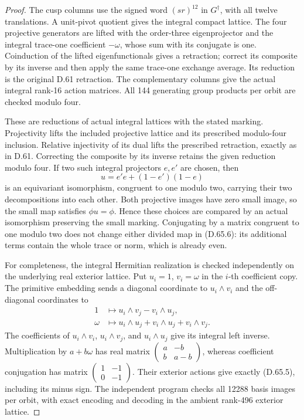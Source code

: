 \begin{proof}
The cusp columns use the signed word \((sr)^{12}\) in
\(G^\dagger\), with all twelve translations. A unit-pivot quotient
gives the integral compact lattice. The four projective generators
are lifted with the order-three eigenprojector and the integral
trace-one coefficient \(-\omega\), whose sum with its conjugate is
one. Coinduction of the lifted eigenfunctionals gives a retraction;
correct its composite by its inverse and then apply the same
trace-one exchange average. Its reduction is the original D.61
retraction. The complementary columns give the actual integral
rank-16 action matrices. All 144 generating group products per
orbit are checked modulo four.

These are reductions of actual integral lattices with the stated
marking. Projectivity lifts the included projective lattice and
its prescribed modulo-four inclusion. Relative injectivity of its
dual lifts the prescribed retraction, exactly as in D.61. Correcting
the composite by its inverse retains the given reduction modulo
four. If two such integral projectors \(e,e'\) are chosen, then
\[
             u=e'e+(1-e')(1-e)
 \tag{D.65.16}
\]
is an equivariant isomorphism, congruent to one modulo two, carrying
their two decompositions into each other. Both projective images
have zero small image, so the small map satisfies \(\phi u=\phi\).
Hence these choices are compared by an actual isomorphism preserving
the small marking. Conjugating by a matrix congruent to one modulo
two does not change either divided map in (D.65.6): its additional
terms contain the whole trace or norm, which is already even.

For completeness, the integral Hermitian realization is checked
independently on the underlying real exterior lattice. Put
\(u_i=1\), \(v_i=\omega\) in the \(i\)-th coefficient copy. The
primitive embedding sends a diagonal coordinate to \(u_i\wedge v_i\)
and the off-diagonal coordinates to
\[
 \begin{aligned}
 1&\longmapsto u_i\wedge v_j-v_i\wedge u_j,\\
 \omega&\longmapsto u_i\wedge u_j+v_i\wedge u_j+v_i\wedge v_j.
 \end{aligned}
 \tag{D.65.17}
\]
The coefficients of \(u_i\wedge v_i\), \(u_i\wedge v_j\), and
\(u_i\wedge u_j\) give its integral left inverse. Multiplication
by \(a+b\omega\) has real matrix
\(\left(\begin{smallmatrix}a&-b\\b&a-b\end{smallmatrix}\right)\),
whereas coefficient conjugation has matrix
\(\left(\begin{smallmatrix}1&-1\\0&-1\end{smallmatrix}\right)\).
Their exterior actions give exactly (D.65.5), including its minus
sign. The independent program 
checks all 12288 basis images per orbit, with exact encoding and
decoding in the ambient rank-496 exterior lattice.


\end{proof}
